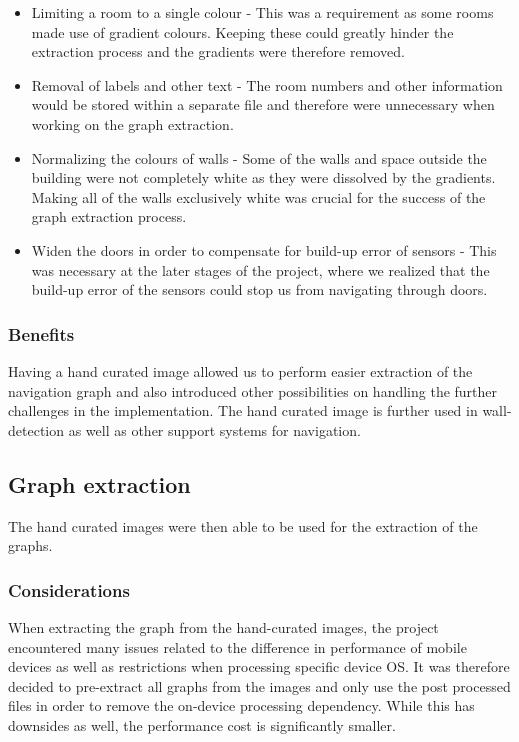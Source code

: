 \documentclass[12pt,a4paper]{report}
\begin{document}
\begin{itemize}

\item Limiting a room to a single colour - This was a requirement as some rooms made use of gradient colours. Keeping these could greatly hinder the extraction process and the gradients were therefore removed.

\item Removal of labels and other text - The room numbers and other information would be stored within a separate file and therefore were unnecessary when working on the graph extraction.
			
\item Normalizing the colours of walls - Some of the walls and space outside the building were not completely white as they were dissolved by the gradients. Making all of the walls exclusively white was crucial for the success of the graph extraction process.
			
\item Widen the doors in order to compensate for build-up error of sensors - This was necessary at the later stages of the project, where we realized that the build-up error of the sensors could stop us from navigating through doors.
\end{itemize}
		
\subsubsection{Benefits}

Having a hand curated image allowed us to perform easier extraction of the navigation graph and also introduced other possibilities on handling the further challenges in the implementation. The hand curated image is further used in wall-detection as well as other support systems for navigation. 
		
\subsection{Graph extraction}

The hand curated images were then able to be used for the extraction of the graphs.

\subsubsection{Considerations}

When extracting the graph from the hand-curated images, the project encountered many issues related to the difference in performance of mobile devices as well as restrictions when processing specific device OS. It was therefore decided to pre-extract all graphs from the images and only use the post processed files in order to remove the on-device processing dependency. While this has downsides as well, the performance cost is significantly smaller.
\newline
		
\end{document}
